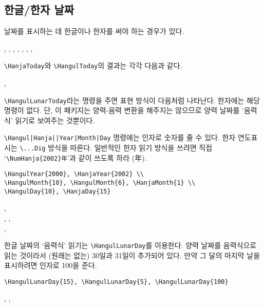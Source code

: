 \documentclass[b5paper,nanum]{oblivoir}
\def\cs#1{\texttt{\textbackslash #1}}
\begin{document}

\subsection{한글/한자 날짜}

날짜를 표시하는 데 한글이나 한자를 써야 하는 경우가 있다.

\begin{boxedverbatim}
, , ,
, , ,
\HanjaToday, \HangulToday
\end{boxedverbatim}

\cs{HanjaToday}와 \cs{HangulToday}의 결과는 각각 다음과 같다.

\medskip

\HanjaToday, \HangulToday

\medskip

\cs{HangulLunarToday}라는 명령을 주면 표현 방식이 다음처럼 나타난다. 한자에는 해당 명령이 없다.
단, 이 패키지는 양력-음력 변환을 해주지는 않으므로 양력 날짜를 `음력식' 읽기로 보여주는 것뿐이다.

\medskip

\HangulLunarToday

\medskip

\cs{Hangul|Hanja||Year|Month|Day} 명령에는 인자로 숫자를 줄 수 있다. 한자 연도표시는 \cs{...Dig} 방식을 따른다. 일반적인 한자 읽기 방식을 쓰려면 직접 `\verb|\NumHanja{2002}年|'과 같이 쓰도록 하라 (年).

\begin{verbatim}
\HangulYear{2000}, \HanjaYear{2002} \\
\HangulMonth{10}, \HangulMonth{6}, \HanjaMonth{1} \\
\HangulDay{10}, \HanjaDay{15}
\end{verbatim}
,  \\
, ,  \\
, 

\medskip

한글 날짜의 `음력식' 읽기는 \cs{HangulLunarDay}를 이용한다. 양력 날짜를 음력식으로 읽는 것이라서 (원래는 없는) 30일과 31일이 추가되어 있다. 만약 그 달의 마지막 날을 표시하려면 인자로 100을 준다.

\begin{verbatim}
\HangulLunarDay{15}, \HangulLunarDay{5}, \HangulLunarDay{100}
\end{verbatim}
, , 
\end{document}
